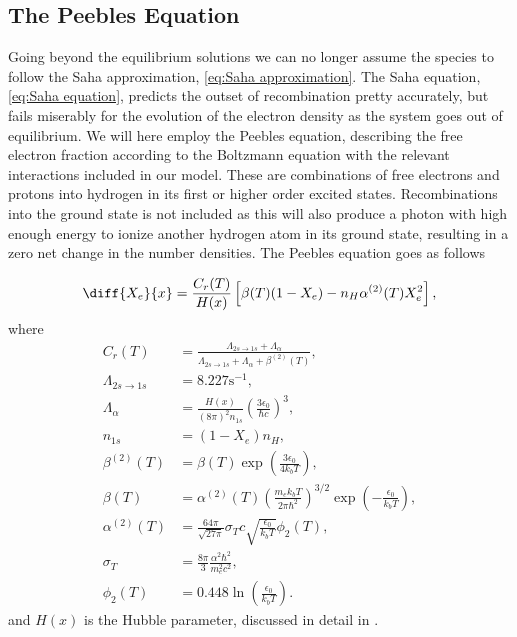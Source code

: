 \documentclass[10pt,a4paper]{article}
\begin{document}
\subsection{The Peebles Equation}
\label{subsec:Theory/Peebles equation}
Going beyond the equilibrium solutions we can no longer assume the species to follow the Saha approximation, \cref{eq:Saha approximation}. The Saha equation, \cref{eq:Saha equation}, predicts the outset of recombination pretty accurately, but fails miserably for the evolution of the electron density as the system goes out of equilibrium. We will here employ the Peebles equation, describing the free electron fraction according to the Boltzmann equation with the relevant interactions included in our model. These are combinations of free electrons and protons into hydrogen in its first or higher order excited states. Recombinations into the ground state is not included as this will also produce a photon with high enough energy to ionize another hydrogen atom in its ground state, resulting in a zero net change in the number densities. The Peebles equation goes as follows 


\begin{equation}
\diff{X_e}{x} = \frac{C_r(T)}{H(x)} \left[\beta(T)(1-X_e) - n_H
\alpha^{(2)}(T)X_e^2\right],
\label{eq:Peebles equation}
\end{equation}
where
\begingroup
\allowdisplaybreaks
\begin{align}
C_r(T) &= \frac{\Lambda_{2s\rightarrow1s} +
\Lambda_{\alpha}}{\Lambda_{2s\rightarrow1s} + \Lambda_{\alpha} +
\beta^{(2)}(T)},
\\
\Lambda_{2s\rightarrow1s} &= 8.227 \textrm{s}^{-1},
\\
\Lambda_{\alpha} &= \frac{H(x)}{(8\pi)^2 n_{1s}} \left(\frac{3\epsilon_0}{\hbar c}\right)^3,
\\
n_{1s} &= (1-X_e)n_H,
\\
\beta^{(2)}(T) &= \beta(T) \exp(\frac{3\epsilon_0}{4k_b T}), \label{eq:beta 2}
\\
\beta(T) &= \alpha^{(2)}(T) \left(\frac{m_e k_b T}{2\pi\hbar^2}\right)^{3/2} \exp(-\frac{\epsilon_0}{k_b T}), \label{eq:beta}
\\
\alpha^{(2)}(T) &= \frac{64\pi}{\sqrt{27\pi}} \sigma_T c \sqrt{\frac{\epsilon_0}{k_b T}}\phi_2(T),
\\
\sigma_T &= \frac{8\pi}{3}\frac{\alpha^2\hbar^2}{m_e^2c^2}, \label{eq:sigma T}
\\
\phi_2(T) &= 0.448\ln(\frac{\epsilon_0}{k_b T}). \label{eq:phi Peebles}
\end{align}
\endgroup
and $H(x)$ is the Hubble parameter, discussed in detail in \cite{milestone1}.
\end{document}
